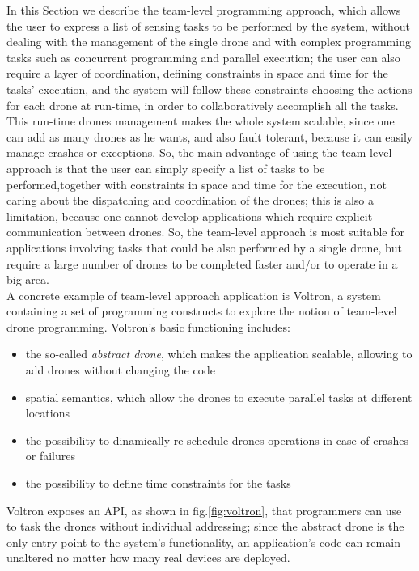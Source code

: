 In this Section we describe the team-level programming approach\cite{voltron}, which allows the user to express a list of sensing tasks to be performed by the system, without dealing with the management of the single drone and with complex programming tasks such as concurrent programming and parallel execution; the user can also require a layer of coordination, defining constraints in space and time for the tasks' execution, and the system will follow these constraints choosing the actions for each drone at run-time, in order to collaboratively accomplish all the tasks.
This run-time drones management makes the whole system scalable, since one can add as many drones as he wants, and also fault tolerant, because it can easily manage crashes or exceptions.
So, the main advantage of using the team-level approach is that the user can simply specify a list of tasks to be performed,together with constraints in space and time for the execution, not caring about the dispatching and coordination of the drones; this is also a limitation, because one cannot develop applications which require explicit communication between drones.
So, the team-level approach is most suitable for applications involving tasks that could be also performed by a single drone, but require a large number of drones to be completed faster and/or to operate in a big area.
\\

A concrete example of team-level approach application is Voltron\cite{voltron}, a system containing a set of programming constructs to explore the notion of team-level drone programming. 
Voltron's\cite{voltron} basic functioning includes:

\begin{itemize}
\itemsep2pt
\item{
the so-called \textit{abstract drone}, which makes the application scalable, allowing to add drones without changing the code
}
\item{spatial semantics, which allow the drones to execute parallel tasks at different locations
}
\item{
the possibility to dinamically re-schedule drones operations in case of crashes or failures
}
\item{
the possibility to define time constraints for the tasks 
}
\end{itemize}

Voltron\cite{voltron} exposes an API, as shown in fig.\ref{fig:voltron}, that programmers can use to task the drones without individual addressing; since the abstract drone is the only entry point to the system’s functionality, an application’s code can remain unaltered no matter how many real devices are deployed.
\\

